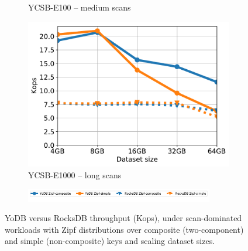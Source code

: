 \documentclass[letterpaper,twocolumn,10pt]{article}
\newcommand{\sys}{YoDB}
\begin{document}
\begin{figure}[tb]
\begin{subfigure}{0.33\linewidth}
\caption{YCSB-E100 -- medium scans}
\label{fig:throughput:e100}
\end{subfigure}
\begin{subfigure}{0.33\linewidth}
\includegraphics[width=\textwidth]{figs/complementary/Workload_E+_line.pdf}
\caption{YCSB-E1000 -- long scans}
\label{fig:throughput:e1000}
\end{subfigure}
\begin{subfigure}{\linewidth}
\centerline{
\includegraphics[width=0.9\textwidth]{figs/legend.pdf}
\vspace{-5mm}
}
\end{subfigure}
\caption{
{\sys\/ versus RocksDB throughput (Kops), under scan-dominated workloads with Zipf distributions over composite (two-component) and
simple (non-composite) keys and scaling dataset sizes.}
}
\label{fig:scans}
\end{figure}
\end{document}
